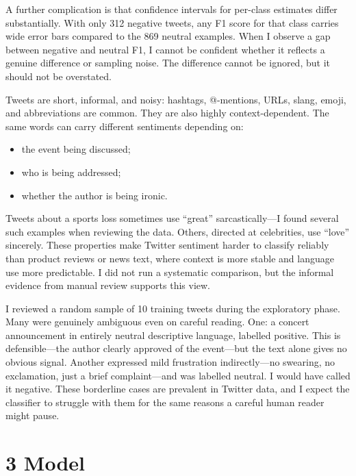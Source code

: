 \documentclass[12pt]{article}
\begin{document}
A further complication is that confidence intervals for per-class estimates differ substantially. With only 312 negative tweets, any F1 score for that class carries wide error bars compared to the 869 neutral examples. When I observe a gap between negative and neutral F1, I cannot be confident whether it reflects a genuine difference or sampling noise. The difference cannot be ignored, but it should not be overstated.

Tweets are short, informal, and noisy: hashtags, @-mentions, URLs, slang, emoji, and abbreviations are common. They are also highly context-dependent. The same words can carry different sentiments depending on:

\begin{itemize}

  \item the event being discussed;

  \item who is being addressed;

  \item whether the author is being ironic.

\end{itemize} Tweets about a sports loss sometimes use ``great'' sarcastically---I found several such examples when reviewing the data. Others, directed at celebrities, use ``love'' sincerely. These properties make Twitter sentiment harder to classify reliably than product reviews or news text, where context is more stable and language use more predictable. I did not run a systematic comparison, but the informal evidence from manual review supports this view.

I reviewed a random sample of 10 training tweets during the exploratory phase. Many were genuinely ambiguous even on careful reading. One: a concert announcement in entirely neutral descriptive language, labelled positive. This is defensible---the author clearly approved of the event---but the text alone gives no obvious signal. Another expressed mild frustration indirectly---no swearing, no exclamation, just a brief complaint---and was labelled neutral. I would have called it negative. These borderline cases are prevalent in Twitter data, and I expect the classifier to struggle with them for the same reasons a careful human reader might pause.



\section*{3 Model}
\end{document}
